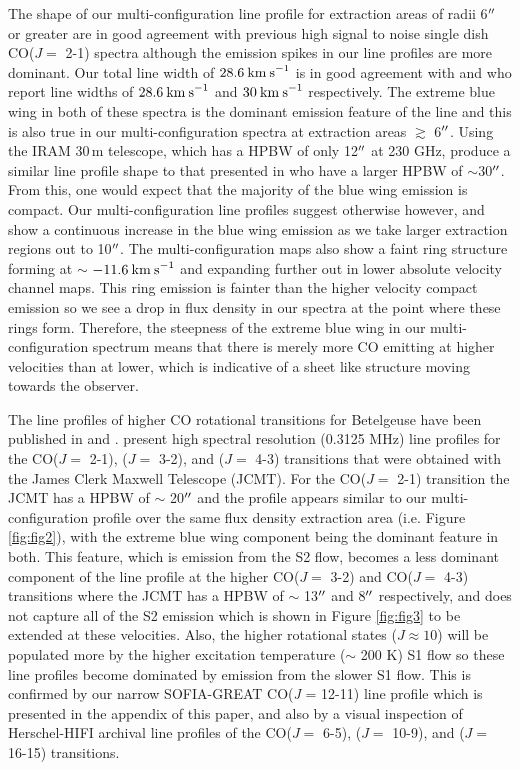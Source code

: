 \documentclass[iop]{emulateapj}
\begin{document}
The shape of our multi-configuration line profile for extraction areas of radii 6$\mbox{$^{\prime\prime}$}$ or greater are in good agreement with previous high signal to noise single dish CO($J=$ 2-1) spectra \cite[e.g.][Fig. 1.]{1994ApJ...424L.127H} although the emission spikes in our line profiles are more dominant. Our total line width of $28.6\>{\rm km\>s}^{-1}$ is in good agreement with \cite{1987ApJ...313..400H} and \cite{1994ApJ...424L.127H} who report line widths of $28.6\>{\rm km\>s}^{-1}$ and $30\>{\rm km\>s}^{-1}$ respectively. The extreme blue wing in both of these spectra is the dominant emission feature of the line and this is also true in our multi-configuration spectra at extraction areas $\gtrsim$ 6$\mbox{$^{\prime\prime}$}$. Using the IRAM 30\,m telescope, which has a HPBW of only 12$\mbox{$^{\prime\prime}$}$ at 230 GHz, \cite{1994ApJ...424L.127H} produce a similar line profile shape to that presented in \cite{1987ApJ...313..400H} who have a larger HPBW of $\sim$30$\mbox{$^{\prime\prime}$}$. From this, one would expect that the majority of the blue wing emission is compact. Our multi-configuration line profiles suggest otherwise however, and show a continuous increase in the blue wing emission as we take larger extraction regions out to 10$\mbox{$^{\prime\prime}$}$. The multi-configuration maps also show a faint ring structure forming at $\sim$ $-11.6\>{\rm km\>s}^{-1}$ and expanding further out in lower absolute velocity channel maps. This ring emission is fainter than the higher velocity compact emission so we see a drop in flux density in our spectra at the point where these rings form. Therefore, the steepness of the extreme blue wing in our multi-configuration spectrum means that there is merely more CO emitting at higher velocities than at lower, which is indicative of a sheet like structure moving towards the observer.

The line profiles of higher CO rotational transitions for Betelgeuse have been published in \cite{2003A&A...407..609K} and \cite{2010A&A...523A..18D}. \cite{2010A&A...523A..18D} present high spectral resolution (0.3125 MHz) line profiles for the CO($J=$ 2-1), ($J=$ 3-2), and ($J=$ 4-3) transitions that were obtained with the James Clerk Maxwell Telescope (JCMT). For the CO($J=$ 2-1) transition the JCMT has a HPBW of $\sim$ 20$\mbox{$^{\prime\prime}$}$ and the profile appears similar to our multi-configuration profile over the same flux density extraction area (i.e. Figure \ref{fig:fig2}), with the extreme blue wing component being the dominant feature in both. This feature, which is emission from the S2 flow, becomes a less dominant component of the line profile at the higher CO($J=$ 3-2) and CO($J=$ 4-3) transitions where the JCMT has a HPBW of $\sim$ 13$\mbox{$^{\prime\prime}$}$ and 8$\mbox{$^{\prime\prime}$}$ respectively, and does not capture all of the S2 emission which is shown in Figure \ref{fig:fig3} to be extended at these velocities. Also, the higher rotational states ($J\approx 10$) will be populated more by the higher excitation temperature ($\sim$ 200 K) S1 flow so these line profiles become dominated by emission from the slower S1 flow. This is confirmed by our narrow SOFIA-GREAT CO(\textit{J} = 12-11) line profile which is presented in the appendix of this paper, and also by a visual inspection of Herschel-HIFI archival line profiles of the CO($J=$ 6-5), ($J=$ 10-9), and ($J=$ 16-15) transitions.
\end{document}
